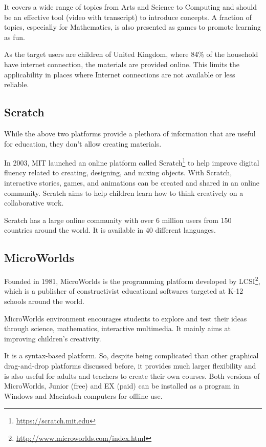 It covers a wide range of topics from Arts and Science to Computing and should be an effective tool (video with transcript) to introduce concepts. A fraction of topics, especially for Mathematics, is also presented as games to promote learning as fun.

As the target users are children of United Kingdom, where 84\% of the household have internet connection, the materials are provided online. This limits the applicability in places where Internet connections are not available or less reliable.

\subsection{Scratch}
While the above two platforms provide a plethora of information that are useful for education, they don't allow creating materials. 

In 2003, MIT launched an online platform called Scratch\footnote{\url{https://scratch.mit.edu}} to help improve digital fluency related to creating, designing, and mixing objects. With Scratch, interactive stories, games, and animations can be created and shared in an online community. Scratch aims to help children learn how to think creatively on a collaborative work.

Scratch has a large online community with over 6 million users from 150 countries around the world. It is available in 40 different languages.
 
 \subsection{MicroWorlds}
Founded in 1981, MicroWorlds is the programming platform developed by LCSI\footnote{\url{http://www.microworlds.com/index.html}}, which is a publisher of constructivist educational softwares targeted at K-12 schools around the world. 

MicroWorlds environment encourages students to explore and test their ideas through science, mathematics, interactive multimedia. It mainly aims at improving children's creativity.

It is a syntax-based platform. So, despite being complicated than other graphical drag-and-drop platforms discussed before, it provides much larger flexibility and is also useful for adults and teachers to create their own courses. Both versions of MicroWorlds, Junior (free) and EX (paid) can be installed as a program in Windows and Macintosh computers for offline use.

